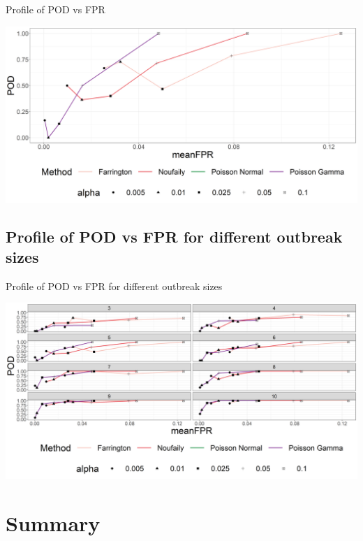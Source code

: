 \documentclass[aspectratio=169]{beamer}
\begin{document}
\begin{frame}{Profile of POD vs FPR}
\tiny

\includegraphics[width=1\linewidth]{../figures/profilePODxFPR_shape}

\normalsize
\end{frame}

\hypertarget{profile-of-pod-vs-fpr-for-different-outbreak-sizes}{%
\subsection{Profile of POD vs FPR for different outbreak
sizes}\label{profile-of-pod-vs-fpr-for-different-outbreak-sizes}}

\begin{frame}{Profile of POD vs FPR for different outbreak sizes}
\tiny

\includegraphics[width=1\linewidth]{../figures/profilePODxFPR_facet}

\normalsize
\end{frame}

\hypertarget{summary}{%
\section{Summary}\label{summary}}
\end{document}
